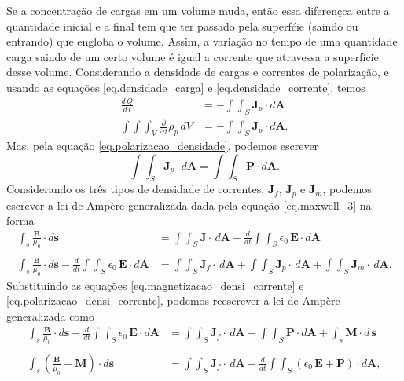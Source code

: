 Se a concentra\c{c}\~ao de cargas em um volume muda, ent\~ao essa diferen\c{c}ca entre a quantidade inicial e a final tem que ter passado pela superf\'cie (saindo ou entrando) que engloba o volume. Assim, a varia\c{c}\~ao no tempo de uma quantidade carga saindo de um certo volume \'e igual a corrente que atravessa a superf\'icie desse volume. Considerando a densidade de cargas e correntes de polariza\c{c}\~ao, e usando as equa\c{c}\~oes \ref{eq.densidade_carga} e \ref{eq.densidade_corrente}, temos
\begin{align*}
\frac{d\,Q}{d\,t}&=-\int\int_S\mathbf{J}_p\cdot d\mathbf{A}\\
\int\int\int_V\frac{\partial}{\partial\,t}\rho_p\,dV&=-\int\int_S\mathbf{J}_p\cdot d\mathbf{A}.
\end{align*}
Mas, pela equa\c{c}\~ao \ref{eq.polarizacao_densidade}, podemos escrever
\begin{equation}\label{eq.polarizacao_densi_corrente}
\int\int_S\mathbf{J}_p\cdot d\mathbf{A}=\int\int_S\mathbf{P}\cdot d\mathbf{A}.
\end{equation} 
Considerando os tr\^es tipos de densidade de correntes, $\mathbf{J}_f$, $\mathbf{J}_p$ e $\mathbf{J}_m$, podemos escrever a lei de Amp\`ere generalizada dada pela equa\c{c}\~ao \ref{eq.maxwell_3} na forma
\begin{align*}
\int_s\frac{\mathbf{B}}{\mu_0}\cdot d\mathbf{s}&=\int\int_S\mathbf{J}\cdot\,d\mathbf{A}+\frac{d}{dt}\int\int_S\epsilon_0\,\textbf{E}\cdot\textit{d}\textbf{A}\\\\
\int_s\frac{\mathbf{B}}{\mu_0}\cdot d\mathbf{s}-\frac{d}{dt}\int\int_S\epsilon_0\,\textbf{E}\cdot\textit{d}\textbf{A}&=\int\int_S\mathbf{J}_f\cdot\,d\mathbf{A}+\int\int_S\mathbf{J}_p\cdot\,d\mathbf{A}+\int\int_S\mathbf{J}_m\cdot\,d\mathbf{A}.
\end{align*}
Substituindo as equa\c{c}\~oes \ref{eq.magnetizacao_densi_corrente} e \ref{eq.polarizacao_densi_corrente}, podemos reescrever a lei de Amp\`ere generalizada como
\begin{align*}
\int_s\frac{\mathbf{B}}{\mu_0}\cdot d\mathbf{s}-\frac{d}{dt}\int\int_S\epsilon_0\,\textbf{E}\cdot\textit{d}\textbf{A}&=\int\int_S\mathbf{J}_f\cdot\,d\mathbf{A}+\int\int_S\mathbf{P}\cdot d\mathbf{A}+\int_s \mathbf{M}\cdot d\,\mathbf{s}\\\\
\int_s(\frac{\mathbf{B}}{\mu_0}-\mathbf{M})\cdot d\mathbf{s}&=\int\int_S\mathbf{J}_f\cdot\,d\mathbf{A}+\frac{d}{dt}\int\int_S(\epsilon_0\,\textbf{E}+\mathbf{P})\cdot\textit{d}\textbf{A},
\end{align*}
